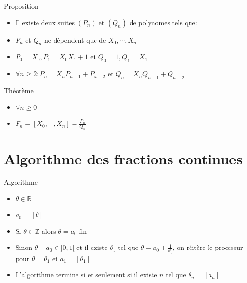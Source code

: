 \documentclass{beamer}
\begin{document}
\begin{frame}{Proposition}
\begin{itemize}
    \item{Il existe deux suites $(P_n)$ et $(Q_n)$ de polynomes tels que:}
    \item{$P_n$ et $Q_n$ ne dépendent que de $X_0,\cdots,X_n$}
    \item{$P_0 = X_0, P_1 = X_0 X_1+1$ et $Q_0 = 1, Q_1 = X_1$}
    \item{$\forall n \geq 2: P_n = X_nP_{n-1}+P_{n-2}$ et $Q_n = X_n Q_{n-1}+Q_{n-2}$}
\end{itemize}
\end{frame}

\begin{frame}{Théorème}
\begin{itemize}
    \item{$\forall n \geq 0$}
    \item{$F_n = [X_0,\cdots, X_n] = \frac{P_n}{Q_n}$}
\end{itemize}
\end{frame}

\section{Algorithme des fractions continues}
\begin{frame}{Algorithme}
\begin{itemize}
    \item{$\theta \in \mathbb{R}$}
    \item{$a_0 = [\theta]$}
    \item{Si $\theta\in \mathbb{Z}$ alors $\theta = a_0$ fin}
    \item{Sinon $\theta-a_0 \in ]0,1[$ et il existe $\theta_1$ tel que $\theta = a_0 + \frac{1}{\theta_1}$, on réitère le processur pour $\theta = \theta_1$ et $a_1=[\theta_1]$}
    \item{L'algorithme termine si et seulement si il existe $n$ tel que $\theta_n = [a_n]$}
\end{itemize}
\end{frame}
\end{document}
